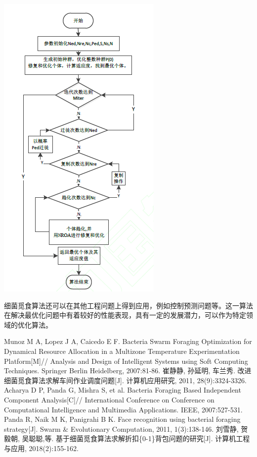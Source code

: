 \documentclass{article}
\begin{document}
\begin{center}
\includegraphics[scale=1]{images/sflow.png}
\end{center}

\vspace{2em}
细菌觅食算法还可以在其他工程问题上得到应用，例如控制预测问题等。这一算法在解决最优化问题中有着较好的性能表现，具有一定的发展潜力，可以作为特定领域的优化算法。



\begin{thebibliography}{20}
Munoz M A, Lopez J A, Caicedo E F. Bacteria Swarm Foraging Optimization for Dynamical Resource Allocation in a Multizone Temperature Experimentation Platform[M]// Analysis and Design of Intelligent Systems using Soft Computing Techniques. Springer Berlin Heidelberg, 2007:81-86.
崔静静, 孙延明, 车兰秀. 改进细菌觅食算法求解车间作业调度问题[J]. 计算机应用研究, 2011, 28(9):3324-3326.
Acharya D P, Panda G, Mishra S, et al. Bacteria Foraging Based Independent Component Analysis[C]// International Conference on Conference on Computational Intelligence and Multimedia Applications. IEEE, 2007:527-531.
Panda R, Naik M K, Panigrahi B K. Face recognition using bacterial foraging strategy[J]. Swarm \& Evolutionary Computation, 2011, 1(3):138-146.
刘雪静, 贺毅朝, 吴聪聪,等. 基于细菌觅食算法求解折扣\{0-1\}背包问题的研究[J]. 计算机工程与应用, 2018(2):155-162.
\end{thebibliography}
\end{document}
